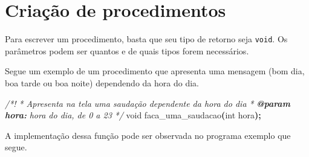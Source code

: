 \documentclass[
  11pt,
  a4paper,
]{scrbook}
\newenvironment{Shaded}{\begin{snugshade}}{\end{snugshade}}
\newcommand{\AnnotationTok}[1]{\textcolor[rgb]{0.56,0.35,0.01}{\textbf{\textit{#1}}}}
\newcommand{\CommentTok}[1]{\textcolor[rgb]{0.56,0.35,0.01}{\textit{#1}}}
\newcommand{\CommentVarTok}[1]{\textcolor[rgb]{0.56,0.35,0.01}{\textbf{\textit{#1}}}}
\newcommand{\DataTypeTok}[1]{\textcolor[rgb]{0.13,0.29,0.53}{#1}}
\newcommand{\NormalTok}[1]{#1}
\newcommand{\OperatorTok}[1]{\textcolor[rgb]{0.81,0.36,0.00}{\textbf{#1}}}
\begin{document}
\section{Criação de procedimentos}\label{criauxe7uxe3o-de-procedimentos}

Para escrever um procedimento, basta que seu tipo de retorno seja
\texttt{void}. Os parâmetros podem ser quantos e de quais tipos forem
necessários.

Segue um exemplo de um procedimento que apresenta uma mensagem (bom dia,
boa tarde ou boa noite) dependendo da hora do dia.

\begin{Shaded}
\begin{Highlighting}[]
\CommentTok{/*!}
\CommentTok{ * Apresenta na tela uma saudação dependente da hora do dia}
\CommentTok{ * }\AnnotationTok{@param}\CommentTok{ }\CommentVarTok{hora:}\CommentTok{ hora do dia, de 0 a 23}
\CommentTok{ */}
\DataTypeTok{void}\NormalTok{ faca\_uma\_saudacao}\OperatorTok{(}\DataTypeTok{int}\NormalTok{ hora}\OperatorTok{);}
\end{Highlighting}
\end{Shaded}

A implementação dessa função pode ser observada no programa exemplo que
segue.
\end{document}

